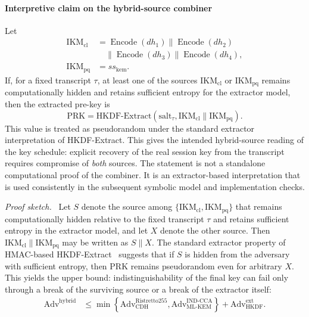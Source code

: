 \documentclass[preprint,12pt]{elsarticle}
\theoremstyle{remark}
\newenvironment{sketchproof}{\par\noindent\textit{Proof sketch.}\ }{\par}
\begin{document}
\paragraph{Interpretive claim on the hybrid-source combiner}
Let
\[
  \begin{aligned}
    \mathrm{IKM}_{\mathrm{cl}}
      &= \operatorname{Encode}(dh_1) \| \operatorname{Encode}(dh_2)\\
      &\quad \| \operatorname{Encode}(dh_3) \|
        \operatorname{Encode}(dh_4),\\
    \mathrm{IKM}_{\mathrm{pq}} &= ss_{\mathrm{kem}}.
  \end{aligned}
\]
If, for a fixed transcript $\tau$, at least one of the sources
$\mathrm{IKM}_{\mathrm{cl}}$ or $\mathrm{IKM}_{\mathrm{pq}}$ remains
computationally hidden and retains sufficient entropy for the extractor
model, then the extracted pre-key is
\[
  \mathrm{PRK} =
  \mathrm{HKDF\text{-}Extract}(\mathrm{salt}_{\tau},
    \mathrm{IKM}_{\mathrm{cl}} \| \mathrm{IKM}_{\mathrm{pq}}).
\]
This value is treated as pseudorandom under the standard extractor
interpretation of HKDF-Extract. This gives the intended hybrid-source
reading of the key schedule: explicit recovery of the real session key from the
transcript requires compromise of \emph{both} sources. The statement is not a
standalone computational proof of the combiner. It is an
extractor-based interpretation that is used consistently in the
subsequent symbolic model and implementation checks.

\begin{sketchproof}
Let $S$ denote the source among
$\{\mathrm{IKM}_{\mathrm{cl}}, \mathrm{IKM}_{\mathrm{pq}}\}$ that
remains computationally hidden relative to the fixed transcript $\tau$
and retains sufficient entropy in the extractor model, and let $X$
denote the other source. Then
$\mathrm{IKM}_{\mathrm{cl}} \| \mathrm{IKM}_{\mathrm{pq}}$ may be
written as $S \| X$. The standard extractor property of HMAC-based
HKDF-Extract~\cite{krawczyk2010} suggests that if $S$ is hidden from the
adversary with sufficient entropy, then $\mathrm{PRK}$
remains pseudorandom even for arbitrary $X$. This yields the upper
bound: indistinguishability of the final key can fail only
through a break of the surviving source or a break of the extractor
itself:
\begin{equation}
  \label{eq:hybrid-advantage-bound}
  \begin{aligned}
    \mathrm{Adv}^{\mathrm{hybrid}}
    &\leq
    \min\!\left\{
      \mathrm{Adv}_{\mathrm{CDH}}^{\mathrm{Ristretto255}},
      \mathrm{Adv}_{\mathrm{ML\text{-}KEM}}^{\mathrm{IND\text{-}CCA}}
    \right\}
    + \mathrm{Adv}_{\mathrm{HKDF}}^{\mathrm{ext}}.
  \end{aligned}
\end{equation}
\end{sketchproof}
\end{document}
